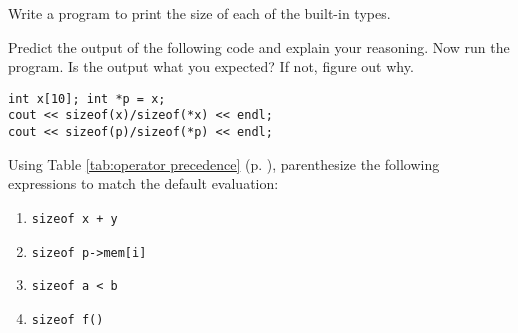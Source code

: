 %
%
\begin{question}
Write a program to print the size of each of the built-in types.
\end{question}

\begin{question}
Predict the output of the following code and explain your
reasoning. Now run the program. Is the output what you expected? If not,
figure out why.
\begin{lstlisting}
int x[10]; int *p = x;
cout << sizeof(x)/sizeof(*x) << endl;
cout << sizeof(p)/sizeof(*p) << endl;
\end{lstlisting}
\end{question}

\begin{question}
Using Table \ref{tab:operator precedence} (p. \pageref{tab:operator precedence}), parenthesize the following
expressions to match the default evaluation:
\begin{enumerate}[label=(\alph*)]
^^I\item \verb|sizeof x + y|
^^I\item \verb|sizeof p->mem[i]|
^^I\item \verb|sizeof a < b|
^^I\item \verb|sizeof f()|
\end{enumerate}
\end{question}
